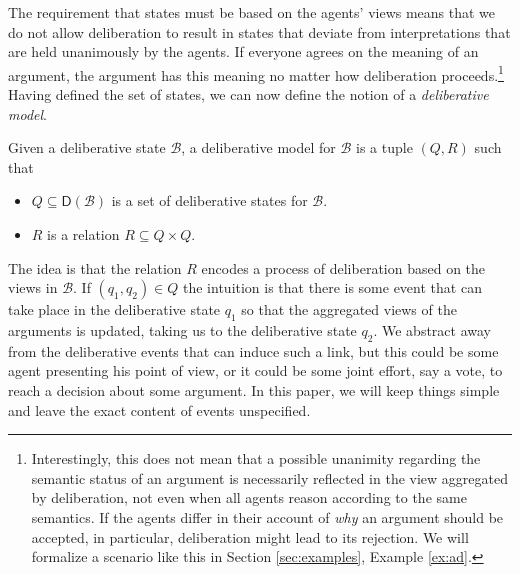 \documentclass[greybox]{svmult}
\newcommand{\dstate}[1]{\mathsf D({#1}) }
\newcommand{\views}{\mathcal B}
\begin{document}
The requirement that states must be based on the agents' views means that we do not allow deliberation to result in states that deviate from interpretations that are held unanimously by the agents. If everyone agrees on the meaning of an argument, the argument has this meaning no matter how deliberation proceeds.\footnote{Interestingly, this does not mean that a possible unanimity regarding the semantic status of an argument is necessarily reflected in the view aggregated by deliberation, not even when all agents reason according to the same semantics. If the agents differ in their account of \emph{why} an argument should be accepted, in particular, deliberation might lead to its rejection. We will formalize a scenario like this in Section \ref{sec:examples}, Example \ref{ex:ad}.} Having defined the set of states, we can now define the notion of a \emph{deliberative model}.

\begin{definition}\label{def:dk}
Given a deliberative state $\views$, a deliberative model for $\views$ is a tuple $(Q,R)$ such that
\begin{itemize}
\item $Q \subseteq \dstate \views$ is a set of deliberative states for $\views$.
\item $R$ is a relation $R \subseteq Q \times Q$.
\end{itemize}
\end{definition}

The idea is that the relation $R$ encodes a process of deliberation based on the views in $\views$. If $(q_1,q_2) \in Q$ the intuition is that there is some event that can take place in the deliberative state $q_1$ so that the aggregated views of the arguments is updated, taking us to the deliberative state $q_2$. We abstract away from the deliberative events that can induce such a link, but this could be some agent presenting his point of view, or it could be some joint effort, say a vote, to reach a decision about some argument. In this paper, we will keep things simple and leave the exact content of events unspecified.
\end{document}

